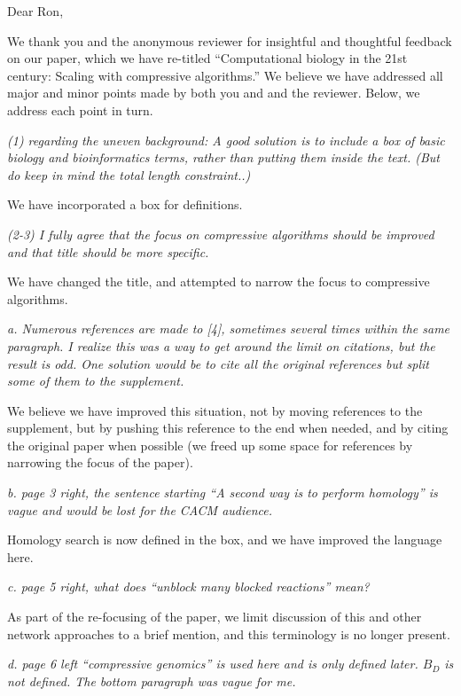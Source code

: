 \documentclass[12pt]{letter}
\begin{document}
\begin{letter}{}
\opening{Dear Ron,}

\medskip

We thank you and the anonymous reviewer for insightful and thoughtful feedback
on our paper, which we have re-titled ``Computational biology in the 21st century: Scaling with compressive algorithms.'' We believe we have addressed
all major and minor points made by both you and and the reviewer.
Below, we address each point in turn.

\emph{(1) regarding the uneven background: A good solution is to include a box of basic biology and bioinformatics terms, rather than putting them inside the text. (But do keep in mind the total length constraint..)}

We have incorporated a box for definitions.
 
\emph{(2-3) I fully agree that the focus on compressive algorithms should be improved and that title should be more specific.}

We have changed the title, and attempted to narrow the focus to compressive algorithms. 
 
\emph{a. Numerous references are made to [4], sometimes several times within the same paragraph. I realize this was a way to get around the limit on citations, but the result is odd. One solution would be to cite all the original references but split some of them to the supplement.}

We believe we have improved this situation, not by moving references to the supplement, but by pushing this reference to the end when needed, and by citing
the original paper when possible (we freed up some space for references by narrowing the focus of the paper).

 
\emph{b. page 3 right, the sentence starting ``A second way is to perform homology'' is vague and would be lost for the CACM audience.}

Homology search is now defined in the box, and we have improved the language here.
 
\emph{c. page 5 right, what does ``unblock many blocked reactions'' mean?}

As part of the re-focusing of the paper, we limit discussion of this and other network approaches to a brief mention, and this terminology is no longer present.
 
\emph{d. page 6 left ``compressive genomics'' is used here and is only defined later. $B_D$ is not defined. The bottom paragraph was vague for me. }


\end{letter}
\end{document}

